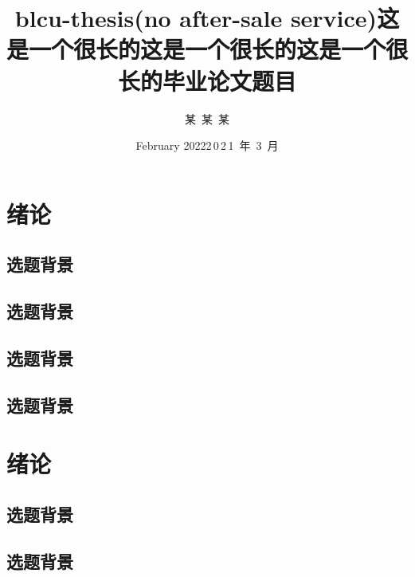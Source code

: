 \documentclass{base}
\title{blcu-thesis(no after-sale service)}
\author{}
\date{February 2022}
\title{这是一个很长的这是一个很长的这是一个很长的毕业论文题目}
\author{某~某~某}    %
\date{2\,0\,2\,1~年~3~月}  %
\begin{document}








\maketoc[pagenumtoc]
\clearpage 
{} 

\mainmatter
\chapter{绪论}
\section{选题背景}
\section{选题背景}
\section{选题背景}
\section{选题背景}
\chapter{绪论}
\section{选题背景}
\section{选题背景}
\end{document}
